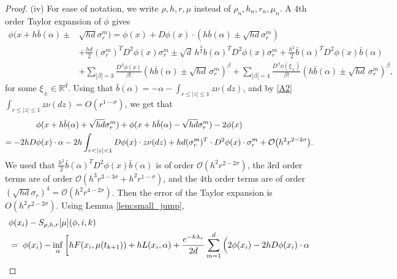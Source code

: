 \documentclass[a4paper,  twoside, 10pt, leqno]{amsart}
\theoremstyle{remark}
\theoremstyle{definition}
\begin{document}
\begin{proof}
\noindent (iv)  For ease of notation, we write $\rho,h,r,\mu$ instead of $\rho_{n}, h_{n}, r_{n}, \mu_{n}$. A $4$th order Taylor expansion of $\phi$ gives
    \begin{align*}
        \phi (x+h \bar{b}(\alpha)  \pm & \sqrt{hd} \sigma_{r}^{m})  =  \phi (x) + D \phi (x) \cdot (h \bar{b}(\alpha) \pm \sqrt{hd} \sigma_r^{m} )  \\
        & + \frac{hd}{2} ( \sigma_{r}^{m})^T  D^2 \phi (x) \sigma_r^{m} \pm  \sqrt{d}\,h^{\frac{3}{2}}  b(\alpha)^{T} D^{2} \phi ( x ) \sigma_{r}^{m} + \frac{h^{2}}{2} \bar{b} ( \alpha )^{T} D^{2} \phi ( x ) \bar{b}( \alpha ) \\[0.2cm]
        &  + \sum_{|\beta| = 3} \frac{D^{\beta} \phi ( x )}{\beta !} ( h \bar{b} ( \alpha ) \pm \sqrt{hd}\, \sigma_{r}^{m} )^{\beta} + \sum_{|\beta| = 4} \frac{D^{\beta} \phi ( \xi_{\pm} )}{\beta !} ( h \bar{b} ( \alpha ) \pm \sqrt{hd}\, \sigma_{r}^{m} )^{\beta},
    \end{align*}
    for some $\xi_{\pm} \in \mathbb{R}^{d}$. Using that $\bar{b} ( \alpha ) = - \alpha - \int_{ r \leq |z| \leq 1 } z \nu ( dz )   $, and by \ref{A2} $\int_{r \leq |z| \leq 1} z \nu ( dz ) = O ( r^{1-\sigma} )$, we get that 
    \begin{align}\label{err_bnd-consist00}
  &  \phi (x+h \bar{b}(\alpha) + \sqrt{hd} \sigma_{r}^{m}) + \phi (x+h \bar{b}(\alpha) - \sqrt{hd} \sigma_{r}^{m}) -2\phi (x) \\
   \notag =   -2 h D & \phi ( x ) \cdot \alpha - 2h \int_{ r < |z| <1 } D \phi ( x ) \cdot z \nu ( dz )
        + hd ( \sigma_{r}^{m})^T \cdot D^2\phi(x) \cdot \sigma_r^{m}   + \mathcal{O}\big(h^2r^{2-2 \sigma}\big).
    \end{align}
    We used that $\frac{h^{2}}{2} \bar{b} ( \alpha )^{T} D^{2} \phi ( x ) \bar{b}( \alpha )$ is of order $\mathcal{O} ( h^{2} r^{2-2 \sigma} )$,
    the $3$rd order terms are of order  $\mathcal{O} ( h^{3} r^{3- 3 \sigma} + h^{2} r^{1-\sigma})$, 
     and the $4$th order terms are of order 
     $( \sqrt{hd} \sigma_{r} )^{4} = \mathcal{O} (h^2 r^{4-2 \sigma}  )$. Then the
    error of the Taylor expansion is $O ( h^{2} r^{2- 2 \sigma} )$.
    Using Lemma \ref{lem:small_jump},
\begin{align} \label{consist_esti0}
    \notag &\phi ( x_{i} ) - S_{\rho,h,r} [ \mu ] ( \phi, i,k )\\
\notag  & = \  \phi ( x_{i} ) - \inf_{\alpha} \bigg[ h F ( x_{i}, \mu ( t_{k+1} ) ) + h L (x_{i}, \alpha )  + \frac{e^{-h \lambda_r}}{2d} \sum_{m=1}^{d} \Big(  2\phi ( x_{i} ) -  2h D \phi ( x_{i} ) \cdot \alpha  \\ 

\end{align}
\end{proof}
\end{document}
